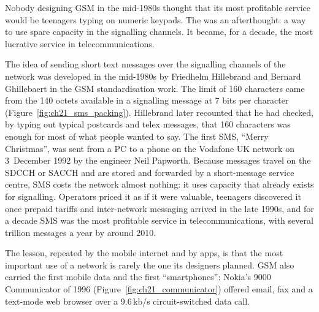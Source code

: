 Nobody designing GSM in the mid-1980s thought that its most profitable service would be teenagers
typing on numeric keypads. The  was an afterthought: a way to use spare
capacity in the signalling channels. It became, for a decade, the most lucrative service in
telecommunications.

\begin{history}
The idea of sending short text messages over the signalling channels of the network was developed
in the mid-1980s by Friedhelm Hillebrand and Bernard Ghillebaert in the GSM standardisation work.
The limit of 160 characters came from the 140 octets available in a signalling message at 7 bits
per character (Figure~\ref{fig:ch21_sms_packing}). Hillebrand later recounted that he had checked,
by typing out typical postcards and telex messages, that 160 characters was enough for most of what
people wanted to say. The first SMS, ``Merry Christmas'', was sent from a PC to a phone on the
Vodafone UK network on 3~December 1992 by the engineer Neil Papworth. Because messages travel on the
SDCCH or SACCH and are stored and forwarded by a short-message service centre, SMS costs the network
almost nothing: it uses capacity that already exists for signalling. Operators priced it as if it
were valuable, teenagers discovered it once prepaid tariffs and inter-network messaging arrived in
the late 1990s, and for a decade SMS was the most profitable service in telecommunications, with
several trillion messages a year by around 2010.
\end{history}


The lesson, repeated by the mobile internet and by apps, is that the most important use of a network
is rarely the one its designers planned. GSM also carried the first mobile data and the first
``smartphones'': Nokia's 9000 Communicator of 1996 (Figure~\ref{fig:ch21_communicator}) offered
email, fax and a text-mode web browser over a 9.6\,kb/s circuit-switched data call.


